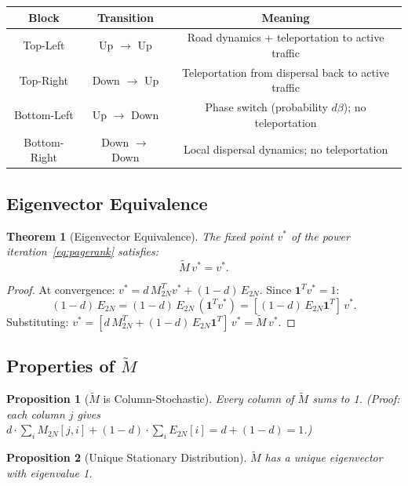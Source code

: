 \documentclass[12pt,a4paper]{article}
\theoremstyle{definition}
\theoremstyle{plain}
\newtheorem{theorem}{Theorem}[section]
\newtheorem{proposition}{Proposition}[section]
\begin{document}
\begin{center}
\renewcommand{\arraystretch}{1.4}
\begin{tabular}{|c|c|c|}
\hline
\textbf{Block} & \textbf{Transition} & \textbf{Meaning} \\
\hline
Top-Left & Up $\to$ Up & Road dynamics + teleportation to active traffic\\
\hline
Top-Right & Down $\to$ Up & Teleportation from dispersal back to active traffic\\
\hline
Bottom-Left & Up $\to$ Down & Phase switch (probability $d\beta$); no teleportation\\
\hline
Bottom-Right & Down $\to$ Down & Local dispersal dynamics; no teleportation\\
\hline
\end{tabular}
\end{center}

\subsection{Eigenvector Equivalence}

\begin{theorem}[Eigenvector Equivalence]
  \label{thm:equiv}
  The fixed point $v^*$ of the power iteration~\eqref{eq:pagerank} satisfies:
  \[
    \widetilde{M}\,v^* = v^*.
  \]
\end{theorem}

\begin{proof}
  At convergence: $v^* = d\,M_{2N}^T v^* + (1-d)\,E_{2N}$. Since $\bm{1}^T v^* = 1$:
  \[
    (1-d)\,E_{2N} = (1-d)\,E_{2N}\,(\bm{1}^T v^*) = [(1-d)\,E_{2N}\bm{1}^T]\,v^*.
  \]
  Substituting: $v^* = [d\,M_{2N}^T + (1-d)\,E_{2N}\bm{1}^T]\,v^* = \widetilde{M}\,v^*$.
  \qedhere
\end{proof}

\subsection{Properties of $\widetilde{M}$}

\begin{proposition}[$\widetilde{M}$ is Column-Stochastic]
  Every column of $\widetilde{M}$ sums to 1. \emph{(Proof: each column $j$ gives
  $d\cdot\sum_i M_{2N}[j,i] + (1-d)\cdot\sum_i E_{2N}[i] = d + (1-d) = 1$.)}
\end{proposition}

\begin{proposition}[Unique Stationary Distribution]
  $\widetilde{M}$ has a unique eigenvector with eigenvalue 1.
\end{proposition}
\end{document}
